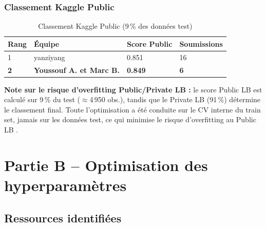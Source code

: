 \documentclass[11pt,a4paper]{article}
\begin{document}
\subsubsection{Classement Kaggle Public}

\begin{table}[H]
\caption{Classement Kaggle Public (9\,\% des données test)}
\label{tab:kaggle}
\centering\small
\begin{tabular}{C{1.5cm} L{5.5cm} C{2.8cm} C{2.5cm}}
\toprule
{}
\textbf{Rang} & \textbf{Équipe} & \textbf{Score Public} & \textbf{Soumissions} \\
 & yanziyang & 0.851 & 16 \\
\textbf{2} & \textbf{Youssouf A. et Marc B.} & \textbf{0.849} & \textbf{6} \\
\bottomrule
\end{tabular}
\end{table}

\textbf{Note sur le risque d'overfitting Public/Private LB :} le score
Public LB est calculé sur 9\,\% du test ($\approx$4\,950 obs.), tandis
que le Private LB (91\,\%) détermine le classement final. Toute
l'optimisation a été conduite sur le CV interne du train set, jamais sur
les données test, ce qui minimise le risque d'overfitting au Public LB
\parencite{bergstra2012}.

\section{Partie B -- Optimisation des hyperparamètres}

\subsection{Ressources identifiées}
\end{document}
